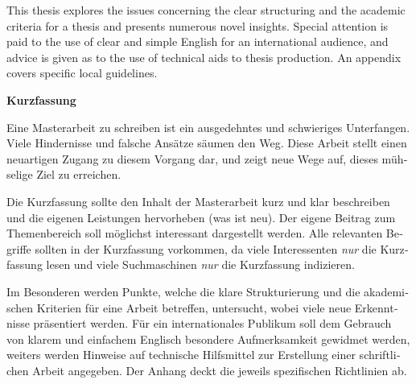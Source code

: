 This thesis explores the issues concerning the clear structuring and
the academic criteria for a thesis and presents numerous novel
insights. Special attention is paid to the use of clear and simple
English for an international audience, and advice is given as to the
use of technical aids to thesis production. An appendix covers
specific local guidelines.








\cleardoublepage

\vspace*{2cm}


\begin{otherlanguage}{austrian}

\begin{center}
{\Large\sffamily\bfseries Kurzfassung}
\end{center}

Eine Masterarbeit zu schreiben ist ein ausgedehntes und schwieriges
Unterfangen. Viele Hindernisse und falsche Ansätze säumen den
Weg. Diese Arbeit stellt einen neuartigen Zugang zu diesem Vorgang
dar, und zeigt neue Wege auf, dieses mühselige Ziel zu erreichen.

Die Kurzfassung sollte den Inhalt der Masterarbeit kurz und klar
beschreiben und die eigenen Leistungen hervorheben (was ist neu). Der
eigene Beitrag zum Themenbereich soll möglichst interessant
dargestellt werden. Alle relevanten Begriffe sollten in der
Kurzfassung vorkommen, da viele Interessenten \emph{nur} die
Kurzfassung lesen und viele Suchmaschinen \emph{nur} die Kurzfassung
indizieren.

Im Besonderen werden Punkte, welche die klare Strukturierung und die
akademischen Kriterien für eine Arbeit betreffen, untersucht, wobei
viele neue Erkenntnisse präsentiert werden. Für ein internationales
Publikum soll dem Gebrauch von klarem und einfachem Englisch besondere
Aufmerksamkeit gewidmet werden, weiters werden Hinweise auf technische
Hilfsmittel zur Erstellung einer schriftlichen Arbeit angegeben. Der
Anhang deckt die jeweils spezifischen Richtlinien ab.

\end{otherlanguage}



